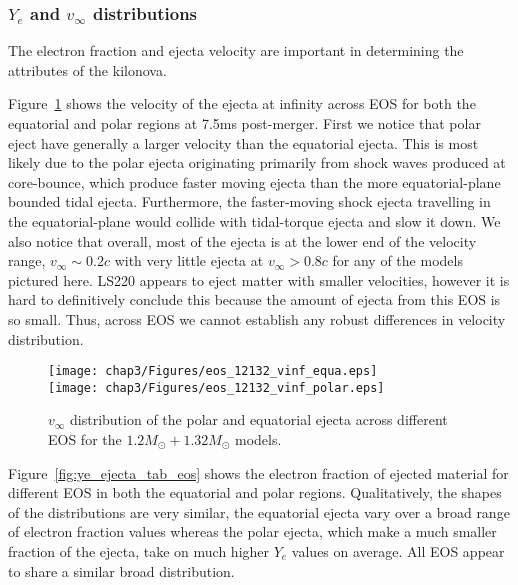 
\subsubsection{$Y_e$ and $v_\infty$ distributions}

The electron fraction and ejecta velocity are important in determining the attributes of the kilonova.

Figure~\ref{fig:vinf_ejecta_tab_eos} shows the velocity of the ejecta at infinity across EOS for both the equatorial and polar regions at 7.5ms post-merger. First we notice that polar eject have generally a larger velocity than the equatorial ejecta. This is most likely due to the polar ejecta originating primarily from shock waves produced at core-bounce, which produce faster moving ejecta than the more equatorial-plane bounded tidal ejecta. Furthermore, the faster-moving shock ejecta travelling in the equatorial-plane would collide with tidal-torque ejecta and slow it down. %
We also notice that overall, most of the ejecta is at the lower end of the velocity range, $v_\infty \sim 0.2c$ with very little ejecta at $v_\infty > 0.8c$ for any of the models pictured here. LS220 appears to eject matter with smaller velocities, however it is hard to definitively conclude this because the amount of ejecta from this EOS is so small. Thus, across EOS we cannot establish any robust differences in velocity distribution.

\begin{figure}[!htbp]
  \texttt{[image: chap3/Figures/eos\_12132\_vinf\_equa.eps]}\\
  \texttt{[image: chap3/Figures/eos\_12132\_vinf\_polar.eps]}
\caption{
   $v_\infty$ distribution of the polar and equatorial ejecta across different EOS for the $1.2M_\odot + 1.32M_\odot$ models.
}
\label{fig:vinf_ejecta_tab_eos}
\end{figure}

  Figure~\ref{fig:ye_ejecta_tab_eos} shows the electron fraction of ejected material for different EOS in both the equatorial and polar regions. Qualitatively, the shapes of the distributions are very similar, the equatorial ejecta vary over a broad range of electron fraction values whereas the polar ejecta, which make a much smaller fraction of the ejecta, take on much higher $Y_e$ values on average. All EOS appear to share a similar broad distribution.
  
